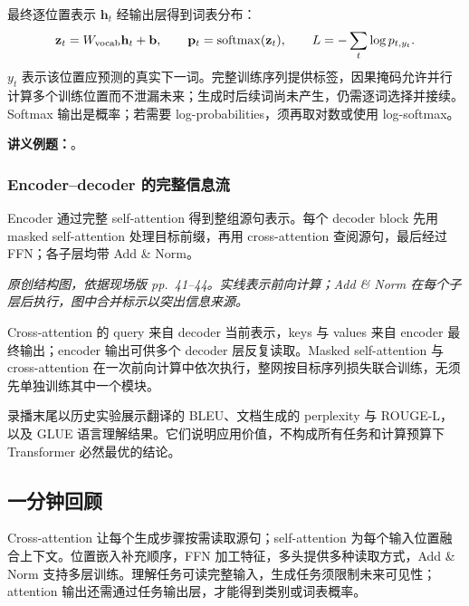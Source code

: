 最终逐位置表示 $\mathbf h_t$ 经输出层得到词表分布：
\[
 \mathbf z_t=W_{\rm vocab}\mathbf h_t+\mathbf b,\qquad
 \mathbf p_t=\operatorname{softmax}(\mathbf z_t),\qquad
 L=-\sum_t\log p_{t,y_t}.
\]
$y_t$ 表示该位置应预测的真实下一词。完整训练序列提供标签，因果掩码允许并行计算多个训练位置而不泄漏未来；生成时后续词尚未产生，仍需逐词选择并接续。Softmax 输出是概率；若需要 log-probabilities，须再取对数或使用 log-softmax。

\textbf{讲义例题：}。

\subsubsection{Encoder--decoder 的完整信息流}

Encoder 通过完整 self-attention 得到整组源句表示。每个 decoder block 先用 masked self-attention 处理目标前缀，再用 cross-attention 查阅源句，最后经过 FFN；各子层均带 Add \& Norm。

\begin{center}

\end{center}
{\small\textit{原创结构图，依据现场版 pp.~41--44。实线表示前向计算；Add \& Norm 在每个子层后执行，图中合并标示以突出信息来源。}}

Cross-attention 的 query 来自 decoder 当前表示，keys 与 values 来自 encoder 最终输出；encoder 输出可供多个 decoder 层反复读取。Masked self-attention 与 cross-attention 在一次前向计算中依次执行，整网按目标序列损失联合训练，无须先单独训练其中一个模块。

录播末尾以历史实验展示翻译的 BLEU、文档生成的 perplexity 与 ROUGE-L，以及 GLUE 语言理解结果。它们说明应用价值，不构成所有任务和计算预算下 Transformer 必然最优的结论。

\subsection*{一分钟回顾}

Cross-attention 让每个生成步骤按需读取源句；self-attention 为每个输入位置融合上下文。位置嵌入补充顺序，FFN 加工特征，多头提供多种读取方式，Add \& Norm 支持多层训练。理解任务可读完整输入，生成任务须限制未来可见性；attention 输出还需通过任务输出层，才能得到类别或词表概率。
\endgroup
